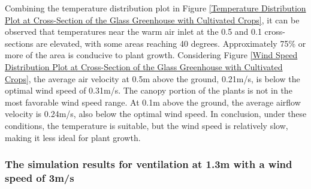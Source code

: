 \documentclass{apmcmthesis}
\begin{document}
{%
Combining the temperature distribution plot in Figure \ref{Temperature Distribution Plot at Cross-Section of the Glass Greenhouse with Cultivated Crops}, it can be observed that temperatures near the warm air inlet at the 0.5 and 0.1 cross-sections are elevated, with some areas reaching 40 degrees. Approximately 75\% or more of the area is conducive to plant growth. Considering Figure \ref{Wind Speed Distribution Plot at Cross-Section of the Glass Greenhouse with Cultivated Crops}, the average air velocity at 0.5m above the ground, 0.21m/s, is below the optimal wind speed of 0.31m/s. The canopy portion of the plants is not in the most favorable wind speed range. At 0.1m above the ground, the average airflow velocity is 0.24m/s, also below the optimal wind speed. In conclusion, under these conditions, the temperature is suitable, but the wind speed is relatively slow, making it less ideal for plant growth.



\subsubsection*{The simulation results for ventilation at 1.3m with a wind speed of 3m/s}
\begin{figure}[htbp]
      \centering
\end{figure}}
\end{document}
